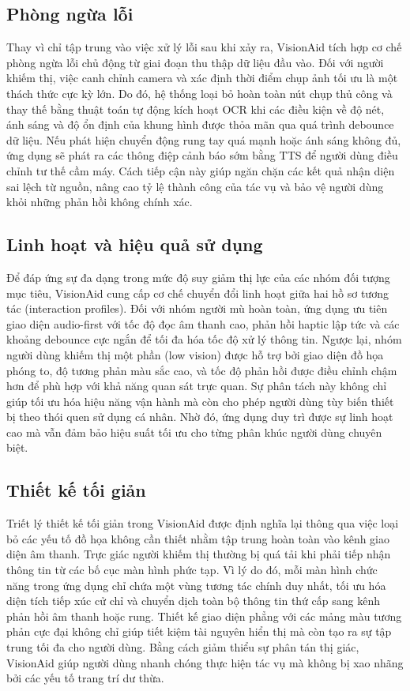 \documentclass[a4paper,13pt]{report}
\begin{document}
\subsection{Phòng ngừa lỗi}

Thay vì chỉ tập trung vào việc xử lý lỗi sau khi xảy ra, VisionAid tích hợp cơ chế phòng ngừa lỗi chủ động từ giai đoạn thu thập dữ liệu đầu vào. Đối với người khiếm thị, việc canh chỉnh camera và xác định thời điểm chụp ảnh tối ưu là một thách thức cực kỳ lớn. Do đó, hệ thống loại bỏ hoàn toàn nút chụp thủ công và thay thế bằng thuật toán tự động kích hoạt OCR khi các điều kiện về độ nét, ánh sáng và độ ổn định của khung hình được thỏa mãn qua quá trình debounce dữ liệu. Nếu phát hiện chuyển động rung tay quá mạnh hoặc ánh sáng không đủ, ứng dụng sẽ phát ra các thông điệp cảnh báo sớm bằng TTS để người dùng điều chỉnh tư thế cầm máy. Cách tiếp cận này giúp ngăn chặn các kết quả nhận diện sai lệch từ nguồn, nâng cao tỷ lệ thành công của tác vụ và bảo vệ người dùng khỏi những phản hồi không chính xác.

\subsection{Linh hoạt và hiệu quả sử dụng}

Để đáp ứng sự đa dạng trong mức độ suy giảm thị lực của các nhóm đối tượng mục tiêu, VisionAid cung cấp cơ chế chuyển đổi linh hoạt giữa hai hồ sơ tương tác (interaction profiles). Đối với nhóm người mù hoàn toàn, ứng dụng ưu tiên giao diện audio-first với tốc độ đọc âm thanh cao, phản hồi haptic lập tức và các khoảng debounce cực ngắn để tối đa hóa tốc độ xử lý thông tin. Ngược lại, nhóm người dùng khiếm thị một phần (low vision) được hỗ trợ bởi giao diện đồ họa phóng to, độ tương phản màu sắc cao, và tốc độ phản hồi được điều chỉnh chậm hơn để phù hợp với khả năng quan sát trực quan. Sự phân tách này không chỉ giúp tối ưu hóa hiệu năng vận hành mà còn cho phép người dùng tùy biến thiết bị theo thói quen sử dụng cá nhân. Nhờ đó, ứng dụng duy trì được sự linh hoạt cao mà vẫn đảm bảo hiệu suất tối ưu cho từng phân khúc người dùng chuyên biệt.

\subsection{Thiết kế tối giản}

Triết lý thiết kế tối giản trong VisionAid được định nghĩa lại thông qua việc loại bỏ các yếu tố đồ họa không cần thiết nhằm tập trung hoàn toàn vào kênh giao diện âm thanh. Trực giác người khiếm thị thường bị quá tải khi phải tiếp nhận thông tin từ các bố cục màn hình phức tạp. Vì lý do đó, mỗi màn hình chức năng trong ứng dụng chỉ chứa một vùng tương tác chính duy nhất, tối ưu hóa diện tích tiếp xúc cử chỉ và chuyển dịch toàn bộ thông tin thứ cấp sang kênh phản hồi âm thanh hoặc rung. Thiết kế giao diện phẳng với các mảng màu tương phản cực đại không chỉ giúp tiết kiệm tài nguyên hiển thị mà còn tạo ra sự tập trung tối đa cho người dùng. Bằng cách giảm thiểu sự phân tán thị giác, VisionAid giúp người dùng nhanh chóng thực hiện tác vụ mà không bị xao nhãng bởi các yếu tố trang trí dư thừa.
\end{document}
